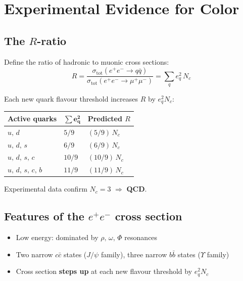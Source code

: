 \documentclass[11pt,a4paper]{article}
\begin{document}
\section{Experimental Evidence for Color}

\subsection{The \texorpdfstring{$R$}{R}-ratio}

Define the ratio of hadronic to muonic cross sections:
\[
  R
  = \frac{\sigma_{\mathrm{tot}}(e^+e^- \to q\bar{q})}
         {\sigma_{\mathrm{tot}}(e^+e^- \to \mu^+\mu^-)}
  = \sum_q e_q^2\, N_c
\]

Each new quark flavour threshold increases $R$ by $e_q^2 N_c$:

\vspace{6pt}
\begin{center}
\begin{tabular}{C{3.5cm} C{2.5cm} C{3.5cm}}
  \toprule
  \color{white}\textbf{Active quarks} &
  \color{white}$\boldsymbol{\sum e_q^2}$ &
  \color{white}\textbf{Predicted $R$} \\
  \midrule
  $u,\, d$           & $5/9$  & $(5/9)\, N_c$  \\
  $u,\, d,\, s$      & $6/9$  & $(6/9)\, N_c$  \\
  $u,\, d,\, s,\, c$ & $10/9$ & $(10/9)\, N_c$ \\
  $u,\, d,\, s,\, c,\, b$ & $11/9$ & $(11/9)\, N_c$ \\
  \bottomrule
\end{tabular}
\end{center}
\vspace{6pt}

Experimental data confirm $\boxed{N_c = 3}$ $\Rightarrow$ \textbf{QCD}.

\subsection{Features of the \texorpdfstring{$e^+e^-$}{e+e-} cross section}

\begin{itemize}
  \item Low energy: dominated by $\rho,\,\omega,\,\Phi$ resonances
  \item Two narrow $c\bar{c}$ states ($J/\psi$ family), three narrow $b\bar{b}$ states ($\Upsilon$ family)
  \item Cross section \textbf{steps up} at each new flavour threshold by $e_q^2 N_c$
\end{itemize}
\end{document}
